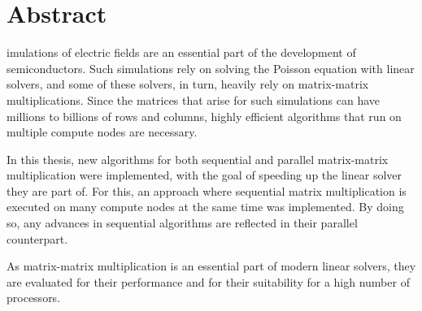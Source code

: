 %
%
%

\chapter*{Abstract}

imulations of electric fields are an essential part of the development of semiconductors. Such simulations rely on solving the Poisson equation with linear solvers, and some of these solvers, in turn, heavily rely on matrix-matrix multiplications. Since the matrices that arise for such simulations can have millions to billions of rows and columns, highly efficient algorithms that run on multiple compute nodes are necessary. 

In this thesis, new algorithms for both sequential and parallel matrix-matrix multiplication were implemented, with the goal of speeding up the linear solver they are part of. For this, an approach where sequential matrix multiplication is executed on many compute nodes at the same time was implemented. By doing so, any advances in sequential algorithms are reflected in their parallel counterpart.

As matrix-matrix multiplication is an essential part of modern linear solvers, they are evaluated for their performance and for their suitability for a high number of processors.

\clearpage